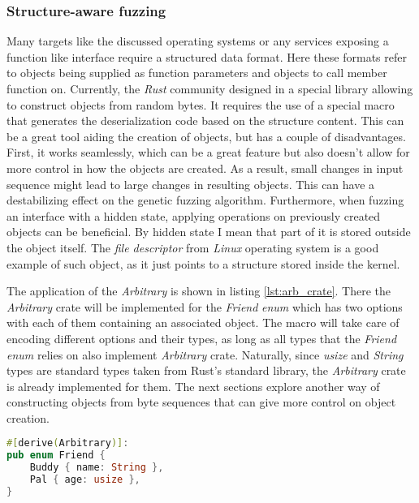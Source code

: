 \subsubsection{Structure-aware fuzzing}
Many targets like the discussed operating systems or any services exposing a function like interface require a structured data format. Here these formats refer to objects being supplied as function parameters and objects to call member function on. Currently, the \textit{Rust} community designed in \cite{rustfuzzbook} a special library allowing to construct objects from random bytes. It requires the use of a special macro that generates the deserialization code based on the structure content. This can be a great tool aiding the creation of objects, but has a couple of disadvantages. First, it works seamlessly, which can be a great feature but also doesn't allow for more control in how the objects are created. As a result, small changes in input sequence might lead to large changes in resulting objects. This can have a destabilizing effect on the genetic fuzzing algorithm. Furthermore, when fuzzing an interface with a hidden state, applying operations on previously created objects can be beneficial. By hidden state I mean that part of it is stored outside the object itself. The \textit{file descriptor} from \textit{Linux} operating system is a good example of such object, as it just points to a structure stored inside the kernel. 

The application of the \textit{Arbitrary} is shown in listing \ref{lst:arb_crate}. There the \textit{Arbitrary} crate will be implemented for the \textit{Friend} \textit{enum} which has two options with each of them containing an associated object. The macro will take care of encoding different options and their types, as long as all types that the \textit{Friend} \textit{enum} relies on also implement \textit{Arbitrary} crate. Naturally, since \textit{usize} and \textit{String} types are standard types taken from Rust's standard library, the \textit{Arbitrary} crate is already implemented for them. The next sections explore another way of constructing objects from byte sequences that can give more control on object creation.

\begin{minipage}{\linewidth}
\begin{lstlisting}[language=Rust,caption={Example of \textit{Arbitrary} crate usage},label={lst:arb_crate}]
#[derive(Arbitrary)]:
pub enum Friend {
    Buddy { name: String },
    Pal { age: usize },
} 
\end{lstlisting} 
\end{minipage}

